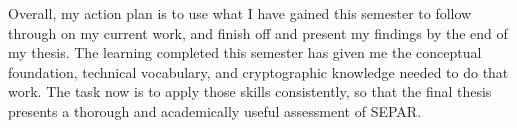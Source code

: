 \documentclass[11pt]{article}
\begin{document}
Overall, my action plan is to use what I have gained this semester to follow through on my current work, and finish off and present my findings by the end of my thesis. The learning completed this semester has given me the conceptual foundation, technical vocabulary, and cryptographic knowledge needed to do that work. The task now is to apply those skills consistently, so that the final thesis presents a thorough and academically useful assessment of SEPAR.
\end{document}
